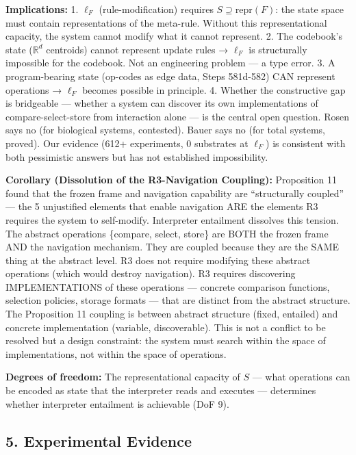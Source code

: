 \documentclass[
  11pt,
]{article}
\begin{document}
\textbf{Implications:} 1. \(\ell_F\) (rule-modification) requires
\(S \supseteq \text{repr}(F)\): the state space must contain
representations of the meta-rule. Without this representational
capacity, the system cannot modify what it cannot represent. 2. The
codebook's state (\(\mathbb{R}^d\) centroids) cannot represent update
rules → \(\ell_F\) is structurally impossible for the codebook. Not an
engineering problem --- a type error. 3. A program-bearing state
(op-codes as edge data, Steps 581d-582) CAN represent operations →
\(\ell_F\) becomes possible in principle. 4. Whether the constructive
gap is bridgeable --- whether a system can discover its own
implementations of compare-select-store from interaction alone --- is
the central open question. Rosen says no (for biological systems,
contested). Bauer says no (for total systems, proved). Our evidence
(612+ experiments, 0 substrates at \(\ell_F\)) is consistent with both
pessimistic answers but has not established impossibility.

\textbf{Corollary (Dissolution of the R3-Navigation Coupling):}
Proposition 11 found that the frozen frame and navigation capability are
``structurally coupled'' --- the 5 unjustified elements that enable
navigation ARE the elements R3 requires the system to self-modify.
Interpreter entailment dissolves this tension. The abstract operations
\{compare, select, store\} are BOTH the frozen frame AND the navigation
mechanism. They are coupled because they are the SAME thing at the
abstract level. R3 does not require modifying these abstract operations
(which would destroy navigation). R3 requires discovering
IMPLEMENTATIONS of these operations --- concrete comparison functions,
selection policies, storage formats --- that are distinct from the
abstract structure. The Proposition 11 coupling is between abstract
structure (fixed, entailed) and concrete implementation (variable,
discoverable). This is not a conflict to be resolved but a design
constraint: the system must search within the space of implementations,
not within the space of operations.

\textbf{Degrees of freedom:} The representational capacity of \(S\) ---
what operations can be encoded as state that the interpreter reads and
executes --- determines whether interpreter entailment is achievable
(DoF 9).

\subsection{5. Experimental Evidence}\label{experimental-evidence}
\end{document}
